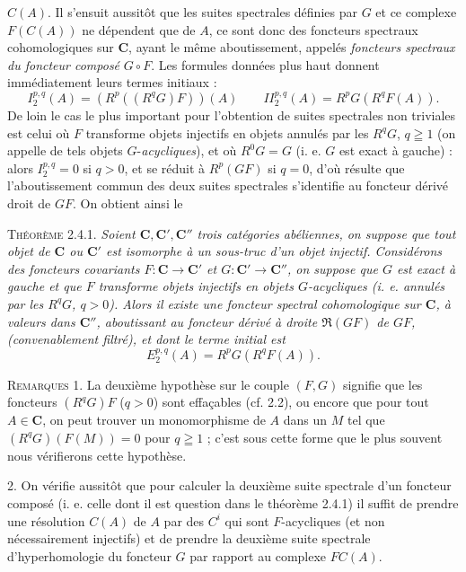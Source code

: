 
\noindent $C(A)$. Il s'ensuit aussitôt que les suites spectrales définies par
$G$ et ce complexe $F(C(A))$ ne dépendent que de $A$, ce sont donc des
foncteurs spectraux cohomologiques sur $\mathbf{C}$, ayant le même aboutissement,
appelés \textit{foncteurs spectraux du foncteur composé} $G\mathbin{\circ}F$.
Les formules données plus haut donnent immédiatement leurs termes initiaux :
\[
I_2^{p,q}(A)=(R^p((R^qG)F))(A)
\qquad
II_2^{p,q}(A)=R^pG(R^qF(A)).
\]
De loin le cas le plus important pour l'obtention de suites spectrales non
triviales est celui où $F$ transforme objets injectifs en objets annulés par
les $R^qG$, $q\geqq1$ (on appelle de tels objets $G$-\textit{acycliques}), et où
$R^0G=G$ (i. e. $G$ est exact à gauche) : alors
$I_2^{p,q}=0$ si $q>0$, et se réduit à $R^p(GF)$ si $q=0$,
d'où résulte que l'aboutissement commun des deux suites spectrales s'identifie
au foncteur dérivé droit de $GF$. On obtient ainsi le

\textsc{Théorème 2.4.1.} \textit{Soient $\mathbf{C},\mathbf{C}',\mathbf{C}''$ trois
catégories abéliennes, on suppose que tout objet de $\mathbf{C}$ ou $\mathbf{C}'$ est isomorphe
à un sous-truc d'un objet injectif. Considérons des foncteurs covariants
$F:\mathbf{C}\to \mathbf{C}'$ et $G:\mathbf{C}'\to \mathbf{C}''$, on suppose que $G$ est
exact à gauche et que $F$ transforme objets injectifs en objets $G$-acycliques
\textup{(}i. e. annulés par les $R^qG$, $q>0$\textup{)}. Alors il existe une foncteur spectral
cohomologique sur $\mathbf{C}$, à valeurs dans $\mathbf{C}''$, aboutissant au foncteur dérivé à
droite $\mathfrak R(GF)$ de $GF$, \textup{(}convenablement filtré\textup{)}, et dont le terme
initial est}
\[
\tag{2.4.3}
E_2^{p,q}(A)=R^pG(R^qF(A)).
\]

\textsc{Remarques 1.} La deuxième hypothèse sur le couple $(F,G)$
signifie que les foncteurs $(R^qG)F$ ($q>0$) sont effaçables (cf. 2.2), ou
encore que pour tout $A\in \mathbf{C}$, on peut trouver un monomorphisme de $A$ dans un
$M$ tel que $(R^qG)(F(M))=0$ pour $q\geqq1$ ; c'est sous cette forme que le plus
souvent nous vérifierons cette hypothèse.

2. On vérifie aussitôt que pour calculer la deuxième suite spectrale
d'un foncteur composé (i. e. celle dont il est question dans le théorème
2.4.1) il suffit de prendre une résolution $C(A)$ de $A$ par des $C^i$ qui
sont $F$-acycliques (et non nécessairement injectifs) et de prendre la
deuxième suite spectrale d'hyperhomologie du foncteur $G$ par rapport au
complexe $FC(A)$.

